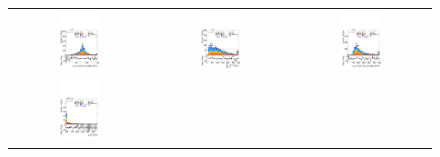 \begin{figure}[htbp]
\begin{tabular}{@{}c c c@{}}
    \includegraphics[width=0.33\textwidth]{images/plots_modelling_run2_run3_variables/run_2_tth/plot_mWbest_hh_tth_15_16_17_18.pdf} &
    \includegraphics[width=0.33\textwidth]{images/plots_modelling_run2_run3_variables/run_2_tth/plot_SumPtBjet_hh_tth_15_16_17_18.pdf} &
    \includegraphics[width=0.33\textwidth]{images/plots_modelling_run2_run3_variables/run_2_tth/plot_mTopWbest_hh_tth_15_16_17_18.pdf} \\[4pt]
    \includegraphics[width=0.33\textwidth]{images/plots_modelling_run2_run3_variables/run_2_tth/plot_ditau_pt_hh_tth_15_16_17_18.pdf} &

\end{tabular}
\end{figure}
